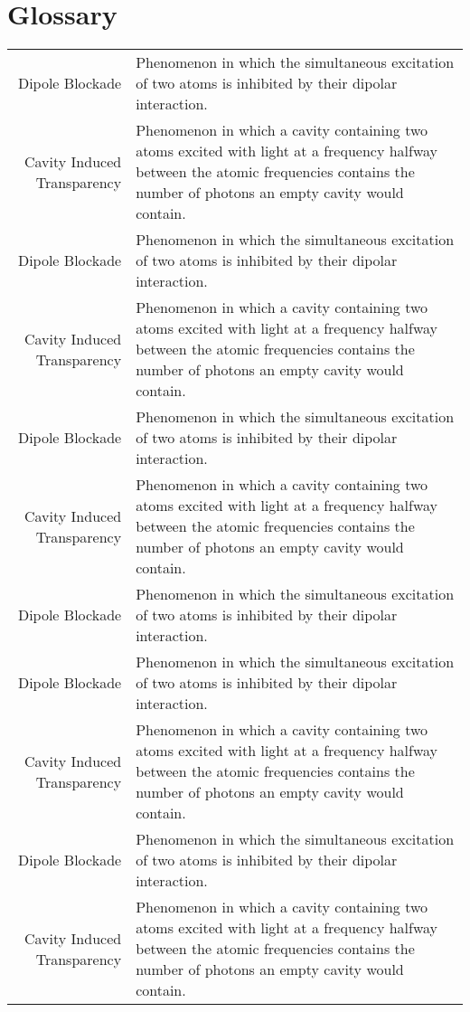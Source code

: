 \chapter*{Glossary} 

\begin{center}
\begin{longtable}{r p{}}
Dipole Blockade & Phenomenon in which the simultaneous excitation of two atoms is inhibited by their dipolar interaction. \\
Cavity Induced Transparency & Phenomenon in which a cavity containing two atoms excited with light at a frequency halfway between the atomic frequencies contains the number of photons an empty cavity would contain.  \\ 
Dipole Blockade & Phenomenon in which the simultaneous excitation of two atoms is inhibited by their dipolar interaction. \\
Cavity Induced Transparency & Phenomenon in which a cavity containing two atoms excited with light at a frequency halfway between the atomic frequencies contains the number of photons an empty cavity would contain.  \\ 
Dipole Blockade & Phenomenon in which the simultaneous excitation of two atoms is inhibited by their dipolar interaction. \\
Cavity Induced Transparency & Phenomenon in which a cavity containing two atoms excited with light at a frequency halfway between the atomic frequencies contains the number of photons an empty cavity would contain.  \\ 
Dipole Blockade & Phenomenon in which the simultaneous excitation of two atoms is inhibited by their dipolar interaction.\\
Dipole Blockade & Phenomenon in which the simultaneous excitation of two atoms is inhibited by their dipolar interaction. \\
Cavity Induced Transparency & Phenomenon in which a cavity containing two atoms excited with light at a frequency halfway between the atomic frequencies contains the number of photons an empty cavity would contain.  \\ 
Dipole Blockade & Phenomenon in which the simultaneous excitation of two atoms is inhibited by their dipolar interaction. \\
Cavity Induced Transparency & Phenomenon in which a cavity containing two atoms excited with light at a frequency halfway between the atomic frequencies contains the number of photons an empty cavity would contain.  \\ 

\end{longtable}
\end{center}

